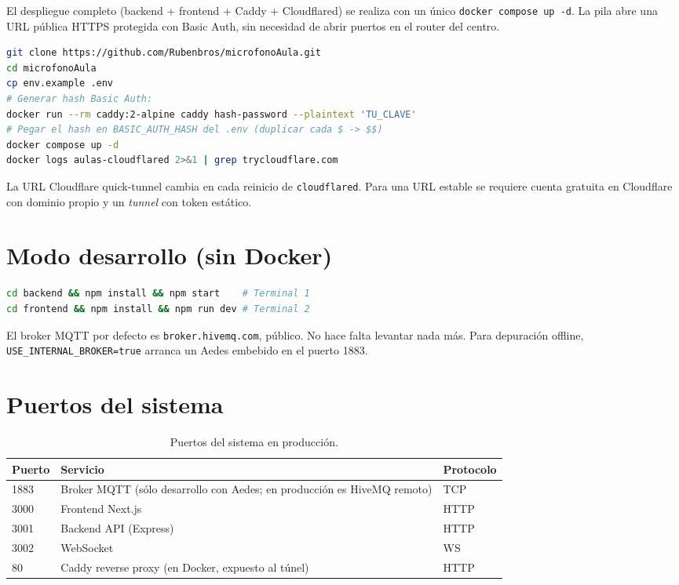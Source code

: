 \documentclass[11pt,a4paper,openany]{report}
\begin{document}
El despliegue completo (backend + frontend + Caddy + Cloudflared) se realiza con un \'unico \texttt{docker compose up -d}. La pila abre una URL p\'ublica HTTPS protegida con Basic Auth, sin necesidad de abrir puertos en el router del centro.

\begin{lstlisting}[language=bash, caption={Despliegue Docker}]
git clone https://github.com/Rubenbros/microfonoAula.git
cd microfonoAula
cp env.example .env
# Generar hash Basic Auth:
docker run --rm caddy:2-alpine caddy hash-password --plaintext 'TU_CLAVE'
# Pegar el hash en BASIC_AUTH_HASH del .env (duplicar cada $ -> $$)
docker compose up -d
docker logs aulas-cloudflared 2>&1 | grep trycloudflare.com
\end{lstlisting}

La URL Cloudflare quick-tunnel cambia en cada reinicio de \texttt{cloudflared}. Para una URL estable se requiere cuenta gratuita en Cloudflare con dominio propio y un \emph{tunnel} con token est\'atico.

\section{Modo desarrollo (sin Docker)}

\begin{lstlisting}[language=bash, caption={Desarrollo local}]
cd backend && npm install && npm start    # Terminal 1
cd frontend && npm install && npm run dev # Terminal 2
\end{lstlisting}

El broker MQTT por defecto es \texttt{broker.hivemq.com}, p\'ublico. No hace falta levantar nada m\'as. Para depuraci\'on offline, \texttt{USE\_INTERNAL\_BROKER=true} arranca un Aedes embebido en el puerto 1883.

\section{Puertos del sistema}

\begin{table}[H]
\centering
{}
\begin{tabularx}{\textwidth}{l X l}
\toprule
\rowcolor{TableHead}
\textbf{Puerto} & \textbf{Servicio} & \textbf{Protocolo} \\ \midrule
1883 & Broker MQTT (s\'olo desarrollo con Aedes; en producci\'on es HiveMQ remoto) & TCP \\
3000 & Frontend Next.js                                                  & HTTP \\
3001 & Backend API (Express)                                             & HTTP \\
3002 & WebSocket                                                         & WS \\
80   & Caddy reverse proxy (en Docker, expuesto al t\'unel)              & HTTP \\ \bottomrule
\end{tabularx}
\caption{Puertos del sistema en producci\'on.}
\end{table}
\end{document}
